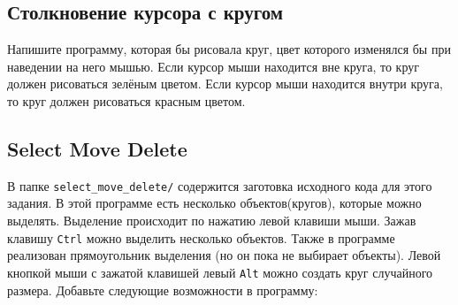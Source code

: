 \documentclass{article}
\begin{document}
\subsection{Столкновение курсора с кругом}
Напишите программу, которая бы рисовала круг, цвет которого изменялся бы при наведении на него мышью. Если курсор мыши находится вне круга, то круг должен рисоваться зелёным цветом. Если курсор мыши находится внутри круга, то круг должен рисоваться красным цветом.

\subsection{Select Move Delete}
 В папке \texttt{select\_move\_delete/} содержится заготовка исходного кода для этого задания. В этой программе есть несколько объектов(кругов), которые можно выделять. Выделение происходит по нажатию левой клавиши мыши. Зажав клавишу \texttt{Ctrl} можно выделить несколько объектов. Также в программе реализован прямоугольник выделения (но он пока не выбирает объекты). Левой кнопкой мыши с зажатой клавишей левый \texttt{Alt} можно создать круг случайного размера. Добавьте следующие возможности в программу:
\end{document}
